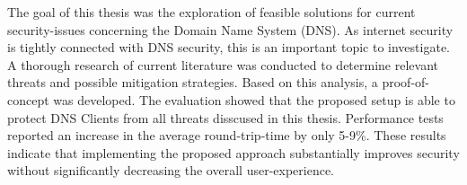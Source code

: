 
The goal of this thesis was the exploration of feasible solutions for current security-issues concerning the Domain Name System (DNS). As internet security is tightly connected with DNS security, this is an important topic to investigate. A thorough research of current literature was conducted to determine relevant threats and possible mitigation strategies. Based on this analysis, a proof-of-concept was developed. The evaluation showed that the proposed setup is able to protect DNS Clients from all threats disscused in this thesis. Performance tests reported an increase in the average round-trip-time by only 5-9\%. These results indicate that implementing the proposed approach substantially improves security without significantly decreasing the overall user-experience.